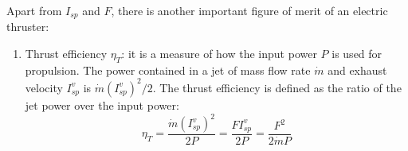 Apart from $I_{sp}$ and $F$, there is another important figure of merit of an 
electric thruster:
%
\begin{enumerate}[resume]

\item Thrust efficiency $\eta_T$: it is a measure of how the input power $P$
is  used for propulsion. The power contained in a jet of mass flow rate $\dot
m$  and exhaust velocity $I_{sp}^v$ is $\dot m (I_{sp}^v)^2/2$. The thrust
efficiency is defined as the ratio of the jet power over the input power:
%
\begin{equation}
\eta_T = \frac{\dot m (I_{sp}^v)^2}{2P} = \frac{ F I_{sp}^v}{2P} =  
\frac{ F^2}{2\dot m P} 
\end{equation}

\end{enumerate}